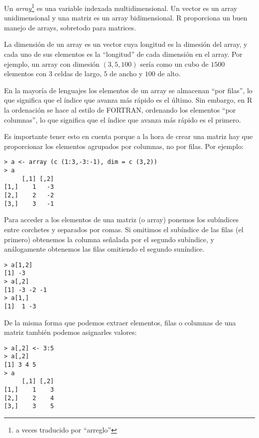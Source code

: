 Un   {\em   array}\footnote{a   veces   traducido   por   ``arreglo''}
 es  una variable indexada multidimensional.  Un vector
es un  array unidimensional  y una matriz  es un  array bidimensional.
{\sf R} proporciona un buen manejo de arrays, sobretodo para matrices.

La dimensión de un array es un vector cuya longitud es la dimesión del
array,  y  cada uno  de  sus  elementos  es  la ``longitud''  de  cada
dimensión en el array. Por  ejemplo, un array con dimesión $(3,5,100)$
sería como un cubo de $1500$ elementos con $3$ celdas de largo, $5$ de
ancho y $100$ de alto.


En la  mayoría de  lenguajes los  elementos de  un array  se almacenan
``por filas'', lo que significa que el índice que avanza más rápido es
el último. Sin embargo, en {\sf R}  la ordenación se hace al estilo de
FORTRAN, ordenando  los elementos  ``por columnas'', lo  que significa
que el índice que avanza más rápido es el primero.

Es importante tener esto en cuenta porque a la hora de crear una 
matriz hay que proporcionar los elementos agrupados por columnas, no 
por filas. Por ejemplo:



\begin{verbatim}
> a <- array (c (1:3,-3:-1), dim = c (3,2)) 
> a
     [,1] [,2]
[1,]    1   -3
[2,]    2   -2
[3,]    3   -1
\end{verbatim}

Para  acceder a  los elementos  de una  matriz (o  array) ponemos  los
subíndices  entre corchetes  y  separados por  comas.  Si omitimos  el
subíndice de las filas (el  primero) obtenemos la columna señalada por
el segundo subíndice, y análogamente  obtenemos las filas omitiendo el
segundo suníndice.


\begin{verbatim}
> a[1,2]
[1] -3
> a[,2]
[1] -3 -2 -1
> a[1,]
[1]  1 -3
\end{verbatim}

De la misma forma que podemos extraer elementos, filas o columnas de
una matriz también podemos asignarles valores:

\begin{verbatim}
> a[,2] <- 3:5
> a[,2]
[1] 3 4 5
> a
     [,1] [,2]
[1,]    1    3
[2,]    2    4
[3,]    3    5
\end{verbatim}


